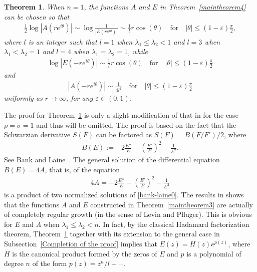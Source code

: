 \documentclass[12pt]{amsart}
\numberwithin{equation}{section}
\newtheorem{theorem}{Theorem}[section]
\begin{document}
\begin{theorem}\label{maintheorem4-asym}
When $n=1$, the functions $A$ and $E$ in Theorem~\ref{maintheorem4} can be chosen so that
\begin{equation*}%
\begin{split}
\frac{1}{2}\log |A(re^{i\theta})|\sim \log\frac{1}{|E(re^{i\theta})|} \sim \frac{1}{l}r\cos(\theta) \quad \text{for} \quad |\theta|\leq (1-\varepsilon)\frac{\pi}{2},
\end{split}
\end{equation*}
where $l$ is an integer such that $l=1$ when $\lambda_1\leq \lambda_2<1$ and $l=3$ when $\lambda_1<\lambda_2=1$ and $l=4$ when $\lambda_1=\lambda_2=1$, while
\begin{equation*}%
\begin{split}
\log |E(-re^{i\theta})|\sim \frac{1}{l}r\cos(\theta) \quad \text{for} \quad |\theta|\leq (1-\varepsilon)\frac{\pi}{2}
\end{split}
\end{equation*}
and
\begin{equation*}%
\begin{split}
|A(-re^{i\theta})|\sim \frac{1}{4l^2} \quad \text{for} \quad |\theta|\leq (1-\varepsilon)\frac{\pi}{2}
\end{split}
\end{equation*}
uniformly as $r\to\infty$, for any $\varepsilon\in(0,1)$.
\end{theorem}

The proof for Theorem~\ref{maintheorem4-asym} is only a slight modification of that in \cite[Theorem~3]{Zhang2024} for the case $\rho=\sigma=1$ and thus will be omitted. The proof is based on the fact that the Schwarzian derivative $S(F)$ can be factored as $S(F)=B(F/F')/2$, where
\begin{equation*}
\begin{split}
B(E):=-2\frac{E''}{E}+\left(\frac{E'}{E}\right)^2-\frac{1}{E^2}.
\end{split}
\end{equation*}
See Bank and Laine~\cite{Banklaine1982,Banklaine1982-2}. The general solution of the differential equation $B(E)=4A$, that is, of the equation
\begin{equation}\label{recuree1pm7}
\begin{split}
4A=-2\frac{E''}{E}+\left(\frac{E'}{E}\right)^2-\frac{1}{E^2}
\end{split}
\end{equation}
is a product of two normalized solutions of \eqref{bank-laine0}. The results in \cite[Theorem~3]{Zhang2024} shows that the functions $A$ and $E$ constructed in Theorem~\ref{maintheorem3} are actually of completely regular growth (in the sense of Levin and Pfluger). This is obvious for $E$ and $A$ when $\lambda_1\leq \lambda_2<n$. In fact, by the classical Hadamard factorization theorem, Theorem~\ref{maintheorem4-asym} together with its extension to the general case in Subsection~\ref{Completion of the proof} implies that $E(z)=H(z)e^{p(z)}$, where $H$ is the canonical product formed by the zeros of $E$ and $p$ is a polynomial of degree $n$ of the form $p(z)=z^n/l+\cdots$.
\end{document}
